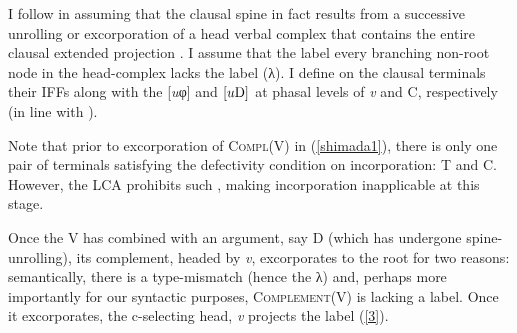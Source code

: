 \documentclass[output=paper]{langsci/langscibook}
\begin{document}
I follow \citet{Shimada:2007} in assuming that the clausal spine in fact
results from a successive unrolling or excorporation of a head verbal complex
that contains the entire clausal extended projection
\parencite[cf.][]{Saito:2012}. I assume that the label every branching
non-root  node in the head-complex lacks the label (λ). I define on the clausal
terminals their \glspl{IFF} along with the [\emph{u}φ] and $[u\textup{D}]$ at
phasal levels of \emph{v} and C, respectively (in line with
\citealt{Roberts2010}).

\begin{exe}
	\ex

	\hfill
	\hfill
\label{shimada1}
\end{exe}

Note that prior to excorporation of \textsc{Compl}(V) in
(\ref{shimada1}), there is only one pair of terminals satisfying the
defectivity condition on incorporation: T and C. However, the
\gls{LCA} prohibits such , making
incorporation inapplicable at this stage.

Once the V has combined with an argument, say D (which has
undergone spine-unrolling), its complement, headed by \emph{v},
excorporates to the root for two reasons: semantically, there is a
type-mismatch (hence the λ) and, perhaps more importantly for our
syntactic purposes, \textsc{Com\-ple\-ment}(V) is lacking
a label. Once it excorporates, the c-selecting head, \emph{v} projects
the label (\ref{3}).

\begin{exe}
	\ex
	\hfill
		\hfill
\label{3}
\end{exe}
\end{document}
